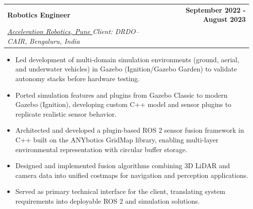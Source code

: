 \documentclass[a4paper,20pt]{article}
\makeatletter
\newcommand{\resumeSubheading}[4]{
  \vspace{-1pt}\item
    \begin{tabular*}{0.97\textwidth}{l@{\extracolsep{\fill}}r}
      \textbf{#1} \small \textit{#4} & #2 \\
      \textit{#3} &  \\
    \end{tabular*}\vspace{-5pt}
}
\newcommand{\resumeSubheading}[5]{ %
  \vspace{-1pt}\item
    \begin{tabular*}{0.97\textwidth}{l@{\extracolsep{\fill}}r}
      \textbf{#1} & #2 \\
      \textit{#3} & \textit{#4} \\
    \end{tabular*} 
    \vspace{-2pt}
    \small #5 %
    \vspace{-5pt}
}
\makeatother
\begin{document}
  \vspace{5pt}
   \resumeSubheading
{Robotics Engineer}{\textbf{September 2022 - August 2023}}
{\href{https://accelerationrobotics.com/about.php}{Acceleration Robotics, Pune }  Client: DRDO–CAIR, Bengaluru, India}{}
\begin{itemize}
\vspace{2}

\item Led development of multi-domain simulation environments (ground, aerial, and underwater vehicles) in Gazebo (Ignition/Gazebo Garden) to validate autonomy stacks before hardware testing. \vspace{-2pt}

\item Ported simulation features and plugins from Gazebo Classic to modern Gazebo (Ignition), developing custom C++ model and sensor plugins to replicate realistic sensor behavior. \vspace{-2pt}

\item Architected and developed a plugin-based ROS 2 sensor fusion framework in C++ built on the ANYbotics GridMap library, enabling multi-layer environmental representation with circular buffer storage. \vspace{-2pt}

\item Designed and implemented fusion algorithms combining 3D LiDAR and camera data into unified costmaps for navigation and perception applications. \vspace{-2pt}

\item Served as primary technical interface for the client, translating system requirements into deployable ROS 2 and simulation solutions. \vspace{-2pt}

\end{itemize}

 
\end{document}
